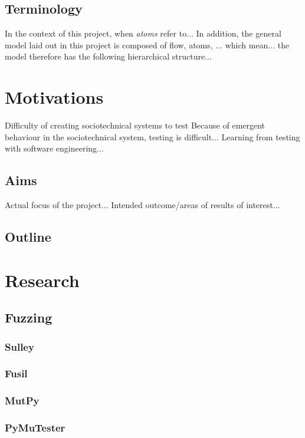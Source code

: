 \documentclass[a4paper]{l4proj}
\begin{document}
\begin{itemize}
\section{Terminology}
\label{introducing_technology}
In the context of this project, when \emph{atoms} refer to...
In addition, the general model laid out in this project is composed of flow, atoms, ... which mean... the model therefore has the following hierarchical structure...

\chapter{Motivations}
\label{motivations}
Difficulty of creating sociotechnical systems to test
Because of emergent behaviour in the sociotechnical system, testing is difficult...
Learning from testing with software engineering...


\section{Aims}
\label{aims}
Actual focus of the project...
Intended outcome/areas of results of interest...


\section{Outline}
\label{outline}


\chapter{Research}
\label{research_head}
\section{Fuzzing}
\label{research_fuzzing}
\subsection{Sulley}
\label{fuzzing_sulley}
\subsection{Fusil}
\label{fuzzing_fuzil}
\subsection{MutPy}
\label{fuzzing_mutpy}
\subsection{PyMuTester}
\label{fuzzing_pymutester}


\end{itemize}
\end{document}
